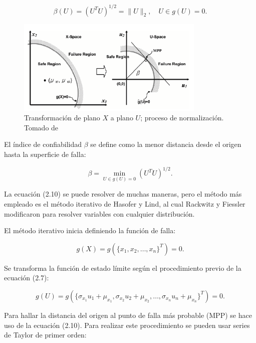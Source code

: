 \begin{equation}
\beta(U) = \left(U^T U\right)^{1/2} = \|U\|_2, \quad U \in g(U) = 0.
\end{equation}

\begin{figure}[H]
    \centering
    \includegraphics[width=0.8\textwidth]{Imagenes/figure3.png} %
    \caption{Transformación de plano \(X\) a plano \(U\); proceso de normalización. Tomado de \protect\cite{choi2006}}
    \label{fig:normalization}
\end{figure}

El índice de confiabilidad \(\beta\) se define como la menor distancia desde el origen hasta la superficie de falla:

\begin{equation}
\beta = \min_{U \in g(U) = 0} \left(U^T U\right)^{1/2}.
\end{equation}

La ecuación (2.10) se puede resolver de muchas maneras, pero el método más empleado es el método iterativo de Hasofer y Lind, al cual Rackwitz y Fiessler modificaron para resolver variables con cualquier distribución.

El método iterativo inicia definiendo la función de falla:

\begin{equation}
g(X) = g\left(\{x_1, x_2, \dots, x_n\}^T\right) = 0.
\end{equation}

Se transforma la función de estado límite según el procedimiento previo de la ecuación (2.7):

\begin{equation}
g(U) = g\left(\{\sigma_{x_1} u_1 + \mu_{x_1}, \sigma_{x_2} u_2 + \mu_{x_2}, \dots, \sigma_{x_n} u_n + \mu_{x_n}\}^T\right) = 0.
\end{equation}

Para hallar la distancia del origen al punto de falla más probable (MPP) se hace uso de la ecuación (2.10). Para realizar este procedimiento se pueden usar series de Taylor de primer orden:

